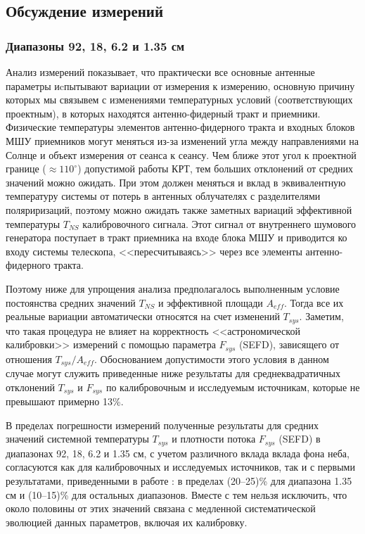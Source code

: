 \subsection{Обсуждение измерений}
\subsubsection{Диапазоны 92, 18, 6.2 и 1.35 см}

Анализ измерений показывает, что практически все основные антенные параметры иcпытывают вариации от
измерения к измерению, основную причину которых мы связывем с изменениями температурных условий
(соответствующих проектным), в которых находятся антенно-фидерный тракт и приемники. Физические
температуры элементов антенно-фидерного тракта и входных блоков МШУ приемников могут меняться из-за
изменений угла между направлениями на Солнце и объект измерения от сеанса к сеансу. Чем ближе этот
угол к проектной границе ($\approx 110^\circ$) допустимой работы КРТ, тем больших отклонений от
средних значений можно ожидать. При этом должен меняться и вклад в эквивалентную температуру системы
от потерь в антенных облучателях с разделителями поляриризаций, поэтому можно ожидать также заметных
вариаций эффективной температуры $T_{NS}$ калибровочного сигнала. Этот сигнал от внутреннего
шумового генератора поступает в тракт приемника на входе блока МШУ и приводится ко входу системы
телескопа, <<пересчитываясь>> через все элементы антенно-фидерного тракта.

Поэтому ниже для упрощения анализа предполагалось выполненным условие постоянства средних значений
$T_{NS}$ и  эффективной площади $A_{eff}$. Тогда все их реальные вариации автоматически относятся на
счет изменений $T_{sys}$. Заметим, что такая процедура не влияет на корректность <<астрономической
калибровки>> измерений с помощью параметра $F_{sys}$ (SEFD), зависящего от отношения $T_{sys} /
A_{eff}$. Обоснованием допустимости этого условия в данном случае могут служить приведенные ниже
результаты для среднеквадратичных отклонений $T_{sys}$ и $F_{sys}$ по калибровочным и исследуемым
источникам, которые не превышают примерно 13\%.

В пределах погрешности измерений полученные результаты для средних значений системной температуры
$T_{sys}$ и плотности потока $F_{sys}$ (SEFD) в диапазонах 92, 18, 6.2 и 1.35 см, с учетом
различного вклада вклада фона неба, согласуются как для калибровочных и исследуемых источников, так
и с первыми результатами, приведенными в работе \cite{Kardashev_2013_rus}: в пределах (20--25)\%
для диапазона 1.35 см и (10--15)\% для остальных диапазонов. Вместе с тем нельзя исключить, что
около половины от этих значений связана с медленной систематической эволюцией данных параметров,
включая их калибровку.

